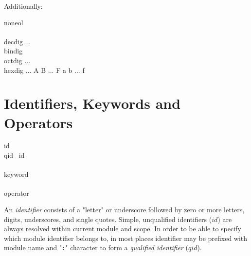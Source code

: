 Additionally:

\begin{bnf}
  noneol \eq {} \\
  \\
  decdig   \gor ...  \\
  bindig   \\
  octdig   \gor ...  \\
  hexdig   \gor ... 
         \gor A \gor B \gor ... \gor F
         \gor a \gor b \gor ... \gor f
\end{bnf}

\section{Identifiers, Keywords and Operators}

\begin{bnf}
  id \eq {} \\
  qid \eq {} \ id \\
  \\
  keyword \eq
      \gor   {}
      \gor   {}
      \gor   {}
      \gor   {}
      \gor   {}
      \gorln {}
      \gor   {}
      \gor   {}
      \gor   {}
      \gor   {}
      \gor   {}
      \gor   {}
      \gor   {}
      \gorln {}
      \gor   {}
      \gor   {}
      \gor   {}
      \gor   {}
      \gor   {}
      \gor   {}
      \gor   {}
      \gorln {}
      \gor   {}
      \gor   {}
      \gor   {}
      \gor   \term{\_} \\
  \\
  operator \eq
           \term{+}
    \gor   \term{-}
    \gor   \term{*}
    \gor   \term{/}
    \gorln \term{(}
    \gor   \term{)}
    \gor   \term{[}
    \gor   \term{]}
    \gor   \term{\{}
    \gor   \term{\}}
    \gor   \term{:}
    \gorln \term{==}
    \gor   \term{<}
    \gor   \term{<=}
    \gor   \term{>}
    \gor   \term{>=}
    \gorln \term{:=}
    \gor   \term{<-}
    \gor   \term{\$}
    \gor   \term{\%}
\end{bnf}

An \emph{identifier} consists of a "letter" or underscore followed by zero or more letters, digits, underscores, and single quotes. Simple, unqualified identifiers (\(id\)) are always resolved within current module and scope. In order to be able to specify which module identifier belongs to, in most places identifier may be prefixed with module name and "\texttt{:}" character to form a \emph{qualified identifier} (\(qid\)).

